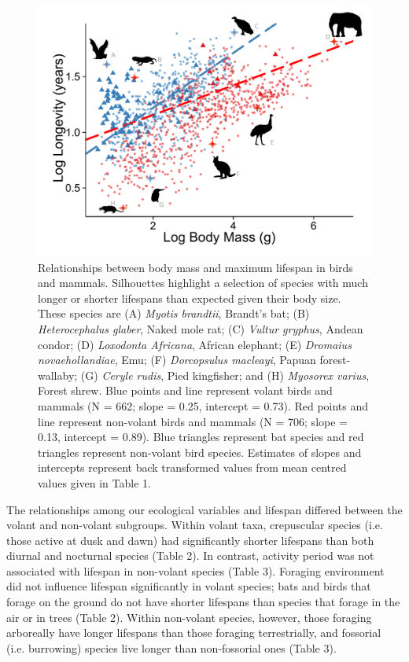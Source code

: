 \begin{figure}[p!]
  \centering
  \includegraphics[width=1.0\textwidth]{ch3-longevity/Figure1.pdf}
  \caption[Figure 1.]{Relationships between body mass and maximum lifespan in birds and mammals. Silhouettes highlight a selection of species with much longer or shorter lifespans than expected given their body size. These species are (A) \textit{Myotis brandtii}, Brandt's bat; (B) \textit{Heterocephalus glaber}, Naked mole rat; (C) \textit{Vultur gryphus}, Andean condor; (D) \textit{Loxodonta Africana}, African elephant; (E) \textit{Dromaius novaehollandiae}, Emu; (F) \textit{Dorcopsulus macleayi}, Papuan forest-wallaby; (G) \textit{Ceryle rudis}, Pied kingfisher; and (H) \textit{Myosorex varius}, Forest shrew. Blue points and line represent volant birds and mammals (N = 662; slope = 0.25, intercept = 0.73). Red points and line represent non-volant birds and mammals (N = 706; slope = 0.13, intercept = 0.89). Blue triangles represent bat species and red triangles represent non-volant bird species. Estimates of slopes and intercepts represent back transformed values from mean centred values given in Table 1.}
  \label{figure:Figure 1.}
\end{figure}


The relationships among our ecological variables and lifespan differed between the volant and non-volant subgroups. Within volant taxa, crepuscular species (i.e. those active at dusk and dawn) had significantly shorter lifespans than both diurnal and nocturnal species (Table 2). In contrast, activity period was not associated with lifespan in non-volant species (Table 3). Foraging environment did not influence lifespan significantly in volant species; bats and birds that forage on the ground do not have shorter lifespans than species that forage in the air or in trees (Table 2). Within non-volant species, however, those foraging arboreally have longer lifespans than those foraging terrestrially, and fossorial (i.e. burrowing) species live longer than non-fossorial ones (Table 3).


